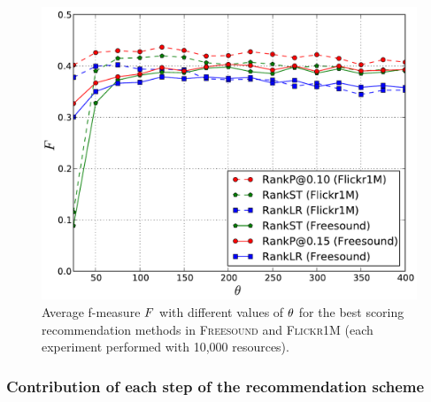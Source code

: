 \begin{figure}[t]
  \centerline{
  \includegraphics[width=\figSizeMid]{ch03_general/pics/10_fmeasure_per_N.pdf}}
  \caption[Average f-measure for different numbers of candidate tags per input tag]{Average f-measure $F$ with different values of $\theta$ for the best scoring recommendation methods in \textsc{Freesound} and \textsc{Flickr1M} (each experiment performed with 10,000 resources).}
  \label{general:fig:ns}
\end{figure}

\subsubsection{Contribution of each step of the recommendation scheme}

